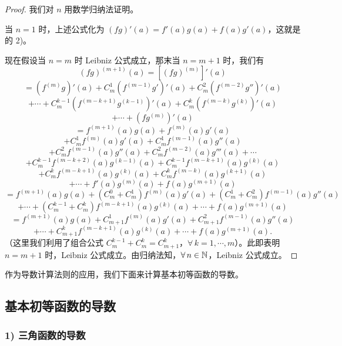\begin{proof}

	我们对 \(n\) 用数学归纳法证明。

	当 \(n=1\) 时，上述公式化为 \((fg)'(a)=f'(a)g(a)+f(a)g'(a)\)，这就是 的 2)。

	现在假设当 \(n=m\) 时 Leibniz 公式成立，那末当 \(n=m+1\) 时，我们有
	\[
	(fg)^{(m+1)}(a)=[(fg)^{(m)}]'(a)
	\]
	\[
	=(f^{(m)}g)'(a)+C_m^1(f^{(m-1)}g')'(a)+C_m^2(f^{(m-2)}g'')'(a)
	\]
	\[
	+\cdots+C_m^{k-1}(f^{(m-k+1)}g^{(k-1)})'(a)+C_m^k(f^{(m-k)}g^{(k)})'(a)
	\]
	\[
	+\cdots+(fg^{(m)})'(a)
	\]
	\[
	=f^{(m+1)}(a)g(a)+f^{(m)}(a)g'(a)
	\]
	\[
	+C_m^1f^{(m)}(a)g'(a)+C_m^1f^{(m-1)}(a)g''(a)
	\]
	\[
	+C_m^2f^{(m-1)}(a)g''(a)+C_m^2f^{(m-2)}(a)g'''(a)+\cdots
	\]
	\[
	+C_m^{k-1}f^{(m-k+2)}(a)g^{(k-1)}(a)+C_m^{k-1}f^{(m-k+1)}(a)g^{(k)}(a)
	\]
	\[
	+C_m^kf^{(m-k+1)}(a)g^{(k)}(a)+C_m^kf^{(m-k)}(a)g^{(k+1)}(a)
	\]
	\[
	+\cdots+f'(a)g^{(m)}(a)+f(a)g^{(m+1)}(a)
	\]
	\[
	=f^{(m+1)}(a)g(a)+(C_m^0+C_m^1)f^{(m)}(a)g'(a)+(C_m^1+C_m^2)f^{(m-1)}(a)g''(a)
	\]
	\[
	+\cdots+(C_m^{k-1}+C_m^k)f^{(m-k+1)}(a)g^{(k)}(a)+\cdots+f(a)g^{(m+1)}(a)
	\]
	\[
	=f^{(m+1)}(a)g(a)+C_{m+1}^1f^{(m)}(a)g'(a)+C_{m+1}^2f^{(m-1)}(a)g''(a)
	\]
	\[
	+\cdots+C_{m+1}^kf^{(m-k+1)}(a)g^{(k)}(a)+\cdots+f(a)g^{(m+1)}(a).
	\]
	（这里我们利用了组合公式 \(C_m^{k-1}+C_m^k=C_{m+1}^k\)，\(\forall\,k=1,\cdots,m\)）。此即表明 \(n=m+1\) 时，Leibniz 公式成立。由归纳法知，\(\forall\,n\in\mathbb{N}\)，Leibniz 公式成立。

\end{proof}

作为导数计算法则的应用，我们下面来计算基本初等函数的导数。

\subsection{基本初等函数的导数}

\subsubsection*{1) 三角函数的导数}

